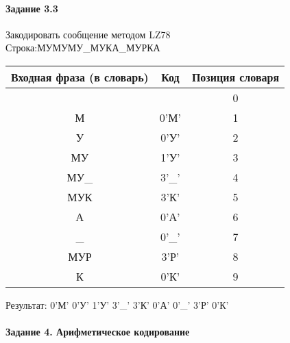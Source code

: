 \documentclass[a4paper, 12pt]{article}
\begin{document}
\pagebreak

\paragraph{Задание 3.3}

Закодировать сообщение методом LZ78\\
Строка:МУМУМУ\_МУКА\_МУРКА\\
\begin{table}[h!]
\centering
\begin{tabular}{|c|c|c|} 
\hline
 Входная фраза (в словарь) & Код & Позиция словаря \\ \hline

 &  & 0 \\ \hline
М & 0'М' & 1 \\ \hline
У & 0'У' & 2 \\ \hline
МУ & 1'У' & 3 \\ \hline
МУ\_ & 3'\_' & 4 \\ \hline
МУК & 3'К' & 5 \\ \hline
А & 0'А' & 6 \\ \hline
\_ & 0'\_' & 7 \\ \hline
МУР & 3'Р' & 8 \\ \hline
К & 0'К' & 9 \\ \hline
\end{tabular}
\end{table}

Результат: 0'М' 0'У' 1'У' 3'\_' 3'К' 0'А' 0'\_' 3'Р' 0'К'\\
\pagebreak
\paragraph{Задание 4. Арифметическое кодирование\\}
\end{document}
